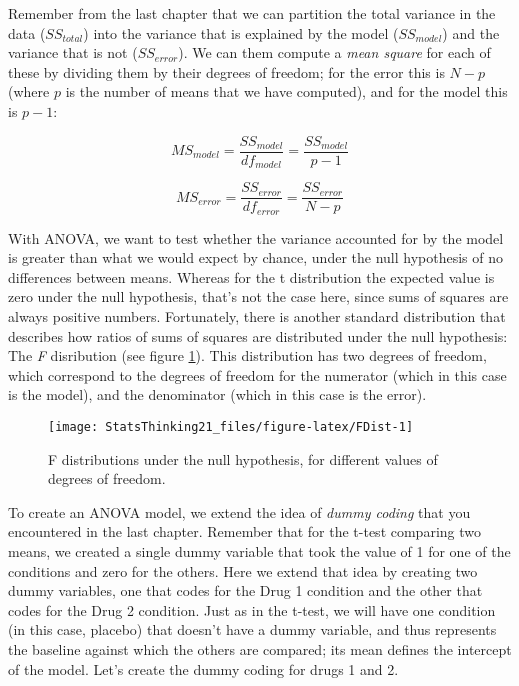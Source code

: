 \documentclass[]{book}
\newenvironment{Shaded}{\begin{snugshade}}{\end{snugshade}}
\newcommand{\KeywordTok}[1]{\textcolor[rgb]{0.13,0.29,0.53}{\textbf{#1}}}
\newcommand{\DataTypeTok}[1]{\textcolor[rgb]{0.13,0.29,0.53}{#1}}
\newcommand{\StringTok}[1]{\textcolor[rgb]{0.31,0.60,0.02}{#1}}
\newcommand{\CommentTok}[1]{\textcolor[rgb]{0.56,0.35,0.01}{\textit{#1}}}
\newcommand{\OperatorTok}[1]{\textcolor[rgb]{0.81,0.36,0.00}{\textbf{#1}}}
\newcommand{\NormalTok}[1]{#1}
\theoremstyle{definition}
\theoremstyle{definition}
\theoremstyle{definition}
\theoremstyle{remark}
\begin{document}
Remember from the last chapter that we can partition the total variance
in the data (\(SS_{total}\)) into the variance that is explained by the
model (\(SS_{model}\)) and the variance that is not (\(SS_{error}\)). We
can them compute a \emph{mean square} for each of these by dividing them
by their degrees of freedom; for the error this is \(N - p\) (where
\(p\) is the number of means that we have computed), and for the model
this is \(p - 1\):

\[
MS_{model} =\frac{SS_{model}}{df_{model}}= \frac{SS_{model}}{p-1}
\]

\[
MS_{error} = \frac{SS_{error}}{df_{error}} = \frac{SS_{error}}{N - p}
\]

With ANOVA, we want to test whether the variance accounted for by the
model is greater than what we would expect by chance, under the null
hypothesis of no differences between means. Whereas for the t
distribution the expected value is zero under the null hypothesis,
that's not the case here, since sums of squares are always positive
numbers. Fortunately, there is another standard distribution that
describes how ratios of sums of squares are distributed under the null
hypothesis: The \emph{F} disribution (see figure \ref{fig:FDist}). This
distribution has two degrees of freedom, which correspond to the degrees
of freedom for the numerator (which in this case is the model), and the
denominator (which in this case is the error).

\begin{figure}
\texttt{[image: StatsThinking21\_files/figure-latex/FDist-1]} \caption{F distributions under the null hypothesis, for different values of degrees of freedom.}\label{fig:FDist}
\end{figure}

To create an ANOVA model, we extend the idea of \emph{dummy coding} that
you encountered in the last chapter. Remember that for the t-test
comparing two means, we created a single dummy variable that took the
value of 1 for one of the conditions and zero for the others. Here we
extend that idea by creating two dummy variables, one that codes for the
Drug 1 condition and the other that codes for the Drug 2 condition. Just
as in the t-test, we will have one condition (in this case, placebo)
that doesn't have a dummy variable, and thus represents the baseline
against which the others are compared; its mean defines the intercept of
the model. Let's create the dummy coding for drugs 1 and 2.

\begin{Shaded}
\end{Shaded}
\end{document}
